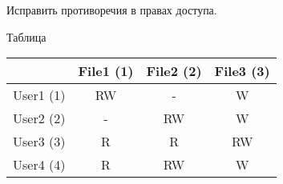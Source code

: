 \begin{problem}
  Исправить противоречия в правах доступа.
\end{problem}

\begin{solution}
  Таблица

  \begin{table}[H]
  \centering
  \begin{tabular}{|l|c|c|c|}
  \hline
   & File1 (1) & File2 (2) & File3 (3) \\ \hline
  User1 (1) & RW & - & W \\ \hline
  User2 (2) & - & RW & W \\ \hline
  User3 (3) & R & R & RW \\ \hline
  User4 (4) & R & RW & W \\ \hline
  \end{tabular}
  \end{table}
\end{solution}
